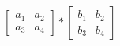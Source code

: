 \documentclass[preview]{standalone}
\begin{document}
\begin{align*}
\begin{bmatrix} a_1 & a_2 \\ a_3 & a_4 \end{bmatrix} * \begin{bmatrix} b_1 & b_2 \\ b_3 & b_4 \end{bmatrix}
\end{align*}
\end{document}
